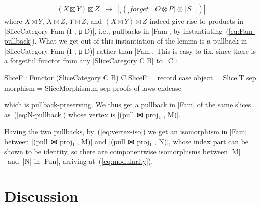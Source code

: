 \begin{itemize}
\[\begin{array}{rcl}
(X \boxtimes Y) \boxtimes Z  & \mapsto & |_ , (_ , forget ⌈ ⌈ O ⊗ P ⌉ ⊗ ⌈ S ⌉ ⌉)|
\end{array} \]
where $X \boxtimes Y$, $X \boxtimes Z$, $Y \boxtimes Z$, and $(X \boxtimes Y) \boxtimes Z$ indeed give rise to products in |SliceCategory Fam (I , μ D)|, i.e., pullbacks in |Fam|, by instantiating~(\ref{eq:Fam-pullback}).
What we get out of this instantiation of the lemma is a pullback in |SliceCategory Fam (I , μ D)| rather than |Fam|.
This is easy to fix, since there is a forgetful functor from any |SliceCategory C B| to~|C|:
\begin{code}
SliceF : Functor (SliceCategory C B) C
SliceF = record  case  object    = Slice.T
                 sep   morphism  = SliceMorphism.m
                 sep   proofs-of-laws endcase
\end{code}
which is pullback-preserving.
We thus get a pullback in |Fam| of the same slices as~(\ref{eq:N-pullback}) whose vertex is |(pull ⋈ proj₁ , M)|.

\end{itemize}

Having the two pullbacks, by~(\ref{eq:vertex-iso}) we get an isomorphism in |Fam| between |(pull ⋈ proj₁ , M)| and |(pull ⋈ proj₁ , N)|, whose index part can be shown to be identity, so there are componentwise isomorphisms between |M|~and~|N| in |Fun|, arriving at~(\ref{eq:modularity}).

\section{Discussion}
\label{sec:categorical-discussion}

